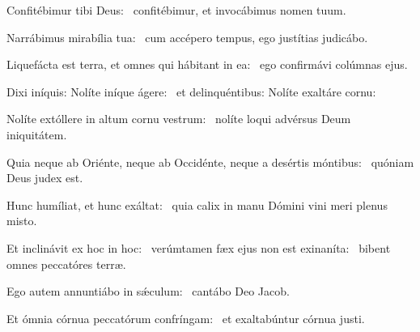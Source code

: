\item Confitébimur tibi Deus:~\psstar{} confitébimur, et invocábimus nomen tuum.

\item Narrábimus mirabília tua:~\psstar{} cum accépero tempus, ego justítias judicábo.

\item Liquefácta est terra, et omnes qui hábitant in ea:~\psstar{} ego confirmávi colúmnas ejus.

\item Dixi iníquis: Nolíte iníque ágere:~\psstar{} et delinquéntibus: Nolíte exaltáre cornu:

\item Nolíte extóllere in altum cornu vestrum:~\psstar{} nolíte loqui advérsus Deum iniquitátem.

\item Quia neque ab Oriénte, neque ab Occidénte, neque a desértis móntibus:~\psstar{} quóniam Deus judex est.

\item Hunc humíliat, et hunc exáltat:~\psstar{} quia calix in manu Dómini vini meri plenus misto.

\item Et inclinávit ex hoc in hoc:~\pscross{} verúmtamen fæx ejus non est exinaníta:~\psstar{} bibent omnes peccatóres terræ.

\item Ego autem annuntiábo in sǽculum:~\psstar{} cantábo Deo Jacob.

\item Et ómnia córnua peccatórum confríngam:~\psstar{} et exaltabúntur córnua justi.

